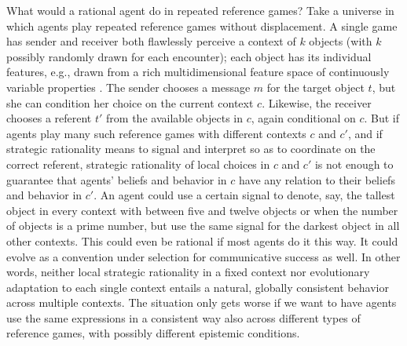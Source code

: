 \documentclass[a4paper]{article}
\begin{document}
What would a rational agent do in repeated reference games? 
Take a universe in which agents play repeated reference games without displacement. 
A single game has sender and receiver both flawlessly perceive a context of $k$ objects (with $k$ possibly randomly drawn for each encounter); each object has its individual features, e.g., drawn from a rich multidimensional feature space of continuously variable properties \parencite[\emph{e.g.}][]{Franke2012:Scales-Salience,Franke2012:On-Scales-Salie}. 
The sender chooses a message $m$ for the target object $t$, but she can condition her choice on the current context $c$. 
Likewise, the receiver chooses a referent $t'$ from the available objects in $c$, again conditional on $c$. 
But if agents play many such reference games with different contexts $c$ and $c'$, and if strategic rationality means to signal and interpret so as to coordinate on the correct referent, strategic rationality of local choices in $c$ and $c'$ is not enough to guarantee that agents' beliefs and behavior in $c$ have any relation to their beliefs and behavior in $c'$. 
An agent could use a certain signal to denote, say, the tallest object in every context with between five and twelve objects or when the number of objects is a prime number, but use the same signal for the darkest object in all other contexts.
This could even be rational if most agents do it this way.
It could evolve as a convention under selection for communicative success as well.
In other words, neither local strategic rationality in a fixed context nor evolutionary adaptation to each single context entails a natural, globally consistent behavior across multiple contexts. 
The situation only gets worse if we want to have agents use the same expressions in a consistent way also across different types of reference games, with possibly different epistemic conditions. 
\end{document}
